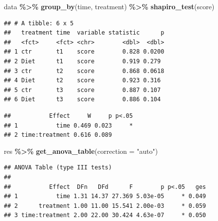 \documentclass[
]{book}
\newenvironment{Shaded}{\begin{snugshade}}{\end{snugshade}}
\newcommand{\AttributeTok}[1]{\textcolor[rgb]{0.13,0.29,0.53}{#1}}
\newcommand{\FunctionTok}[1]{\textcolor[rgb]{0.13,0.29,0.53}{\textbf{#1}}}
\newcommand{\NormalTok}[1]{#1}
\newcommand{\OtherTok}[1]{\textcolor[rgb]{0.56,0.35,0.01}{#1}}
\newcommand{\SpecialCharTok}[1]{\textcolor[rgb]{0.81,0.36,0.00}{\textbf{#1}}}
\newcommand{\StringTok}[1]{\textcolor[rgb]{0.31,0.60,0.02}{#1}}
\begin{document}
\begin{Shaded}
\begin{Highlighting}[]
\NormalTok{data }\SpecialCharTok{\%\textgreater{}\%}
  \FunctionTok{group\_by}\NormalTok{(time, treatment) }\SpecialCharTok{\%\textgreater{}\%}
  \FunctionTok{shapiro\_test}\NormalTok{(score)}
\end{Highlighting}
\end{Shaded}

\begin{verbatim}
## # A tibble: 6 x 5
##   treatment time  variable statistic      p
##   <fct>     <fct> <chr>        <dbl>  <dbl>
## 1 ctr       t1    score        0.828 0.0200
## 2 Diet      t1    score        0.919 0.279 
## 3 ctr       t2    score        0.868 0.0618
## 4 Diet      t2    score        0.923 0.316 
## 5 ctr       t3    score        0.887 0.107 
## 6 Diet      t3    score        0.886 0.104
\end{verbatim}

\begin{Shaded}
\end{Shaded}

\begin{verbatim}
##           Effect     W     p p<.05
## 1           time 0.469 0.023     *
## 2 time:treatment 0.616 0.089
\end{verbatim}

\begin{Shaded}
\begin{Highlighting}[]
\NormalTok{res }\SpecialCharTok{\%\textgreater{}\%} \FunctionTok{get\_anova\_table}\NormalTok{(}\AttributeTok{correction =} \StringTok{"auto"}\NormalTok{)}
\end{Highlighting}
\end{Shaded}

\begin{verbatim}
## ANOVA Table (type III tests)
## 
##           Effect  DFn   DFd      F        p p<.05   ges
## 1           time 1.31 14.37 27.369 5.03e-05     * 0.049
## 2      treatment 1.00 11.00 15.541 2.00e-03     * 0.059
## 3 time:treatment 2.00 22.00 30.424 4.63e-07     * 0.050
\end{verbatim}
\end{document}
